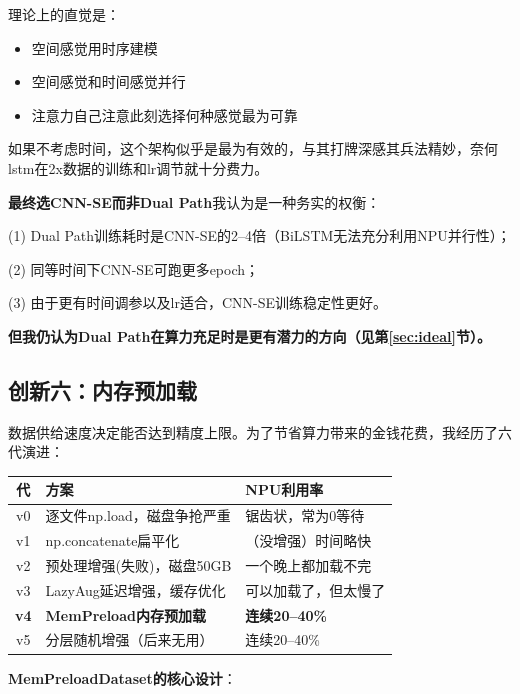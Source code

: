 \documentclass{article}
\begin{document}
理论上的直觉是：

\begin{itemize}
  \item 空间感觉用时序建模
  \item 空间感觉和时间感觉并行
  \item 注意力自己注意此刻选择何种感觉最为可靠
\end{itemize}

如果不考虑时间，这个架构似乎是最为有效的，与其打牌深感其兵法精妙，奈何lstm在2x数据的训练和lr调节就十分费力。

\textbf{最终选CNN-SE而非Dual Path}我认为是一种务实的权衡：

(1) Dual Path训练耗时是CNN-SE的2--4倍（BiLSTM无法充分利用NPU并行性）；

(2) 同等时间下CNN-SE可跑更多epoch；

(3) 由于更有时间调参以及lr适合，CNN-SE训练稳定性更好。

\textbf{但我仍认为Dual Path在算力充足时是更有潜力的方向（见第\ref{sec:ideal}节）。}

\subsection{创新六：内存预加载}

数据供给速度决定能否达到精度上限。为了节省算力带来的金钱花费，我经历了六代演进：

\begin{center}
\footnotesize
\begin{tabular}{cp{2.8cm}p{3.2cm}}
\toprule
代 & 方案 & NPU利用率 \\
\midrule
v0 & 逐文件np.load，磁盘争抢严重 & 锯齿状，常为0等待 \\
v1 & np.concatenate扁平化 & （没增强）时间略快 \\
v2 & 预处理增强(失败)，磁盘50GB & 一个晚上都加载不完 \\
v3 & LazyAug延迟增强，缓存优化 & 可以加载了，但太慢了 \\
\textbf{v4} & \textbf{MemPreload内存预加载} & \textbf{连续20--40\%} \\
v5 & 分层随机增强（后来无用） & 连续20--40\% \\
\bottomrule
\end{tabular}
\end{center}

\textbf{MemPreloadDataset的核心设计}：
\end{document}
